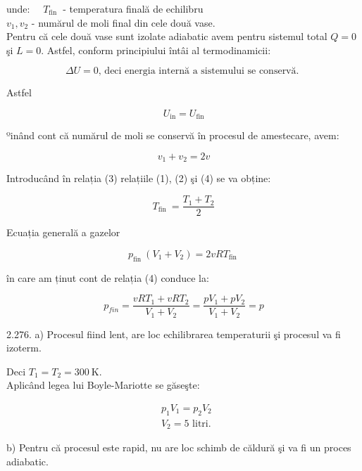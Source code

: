 \documentclass[10pt]{article}
\begin{document}
unde: $\quad T_{\text {fin }}$ - temperatura finală de echilibru\\
$v_{1}, v_{2}$ - numărul de moli final din cele două vase.\\
Pentru că cele două vase sunt izolate adiabatic avem pentru sistemul total $Q=0$ şi $L=0$. Astfel, conform principiului întâi al termodinamicii:

$$
\Delta U=0 \text {, deci energia internă a sistemului se conservă. }
$$

Astfel


\begin{equation*}
U_{\mathrm{in}}=U_{\mathrm{fin}} \tag{3}
\end{equation*}


ºinând cont că numărul de moli se conservă în procesul de amestecare, avem:


\begin{equation*}
v_{1}+v_{2}=2 v \tag{4}
\end{equation*}


Introducând în relația (3) relațiile (1), (2) şi (4) se va obține:

$$
T_{\text {fin }}=\frac{T_{1}+T_{2}}{2}
$$

Ecuația generală a gazelor

$$
p_{\text {fin }}\left(V_{1}+V_{2}\right)=2 v R T_{\text {fin }}
$$

în care am ținut cont de relația (4) conduce la:

$$
p_{f i n}=\frac{v R T_{1}+v R T_{2}}{V_{1}+V_{2}}=\frac{p V_{1}+p V_{2}}{V_{1}+V_{2}}=p
$$

2.276. a) Procesul fiind lent, are loc echilibrarea temperaturii şi procesul va fi izoterm.

Deci $T_{1}=T_{2}=300 \mathrm{~K}$.\\
Aplicând legea lui Boyle-Mariotte se găseşte:

$$
\begin{aligned}
& p_{1} V_{1}=p_{2} V_{2} \\
& V_{2}=5 \text { litri. }
\end{aligned}
$$

b) Pentru că procesul este rapid, nu are loc schimb de căldură şi va fi un proces adiabatic.
\end{document}
